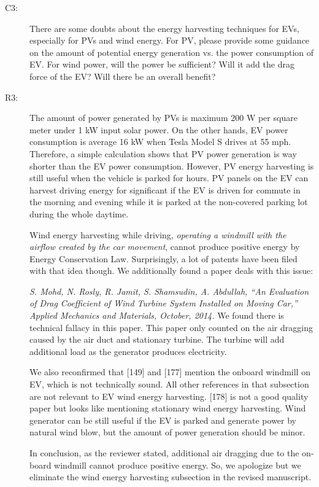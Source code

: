 \documentclass[onecolumn]{IEEEconf}
\begin{document}
\begin{description}
\item [C3: ] There are some doubts about the energy harvesting techniques for EVs, especially for PVs and wind energy. For PV, please provide some guidance on the amount of potential energy generation vs. the power consumption of EV. For wind power, will the power be sufficient? Will it add the drag force of the EV? Will there be an overall benefit?
\item [R3: ] The amount of power generated by PVs is maximum 200 W per square meter under 1 kW input solar power. On the other hands, EV power consumption is average 16 kW when Tesla Model S drives at 55 mph. Therefore, a simple calculation shows that PV power generation is way shorter than the EV power consumption. However, PV energy harvesting is still useful when the vehicle is parked for hours. PV panels on the EV can harvest  driving energy for significant if the EV is driven for commute in the morning and evening while it is parked at the non-covered parking lot during the whole daytime. 

Wind energy harvesting while driving, \textit{operating a windmill with the airflow created by the car movement}, cannot produce positive energy by Energy Conservation Law. Surprisingly, a lot of patents have been filed with that idea though. We additionally found a paper deals with this issue:

\textit{S. Mohd, N. Rosly, R. Jamit, S. Shamsudin, A. Abdullah, ``An Evaluation of Drag Coefficient of Wind Turbine System Installed on Moving Car,'' Applied Mechanics and Materials, October, 2014.} We found there is technical fallacy in this paper. This paper only counted on the air dragging caused by the air duct and stationary turbine. The turbine will add additional load as the generator produces electricity. 

We also reconfirmed that [149] and [177] mention the onboard windmill on EV, which is not technically sound. All other references in that subsection are not relevant to EV wind energy harvesting. [178] is not a good quality paper but looks like mentioning stationary wind energy harvesting. Wind generator can be still useful if the EV is parked and generate power by natural wind blow, but the amount of power generation should be minor.

In conclusion, as the reviewer stated, additional air dragging due to the on-board windmill cannot produce positive energy. So, we apologize but we eliminate the wind energy harvesting subsection in the revised manuscript. 


\end{description}
\end{document}

